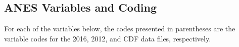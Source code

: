 \documentclass[12pt]{article}
\begin{document}
\begin{appendices}
\begin{refsection}























\clearpage
\section{ANES Variables and Coding}\label{app:variablecoding}
\singlespacing
For each of the variables below, the codes presented in parentheses are the variable codes for the 2016, 2012, and CDF data files, respectively.


\end{refsection}
\end{appendices}
\end{document}

